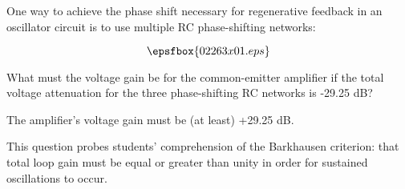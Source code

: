 

One way to achieve the phase shift necessary for regenerative feedback in an oscillator circuit is to use multiple RC phase-shifting networks:

$$\epsfbox{02263x01.eps}$$

What must the voltage gain be for the common-emitter amplifier if the total voltage attenuation for the three phase-shifting RC networks is -29.25 dB?







The amplifier's voltage gain must be (at least) +29.25 dB.







This question probes students' comprehension of the Barkhausen criterion: that total loop gain must be equal or greater than unity in order for sustained oscillations to occur.




